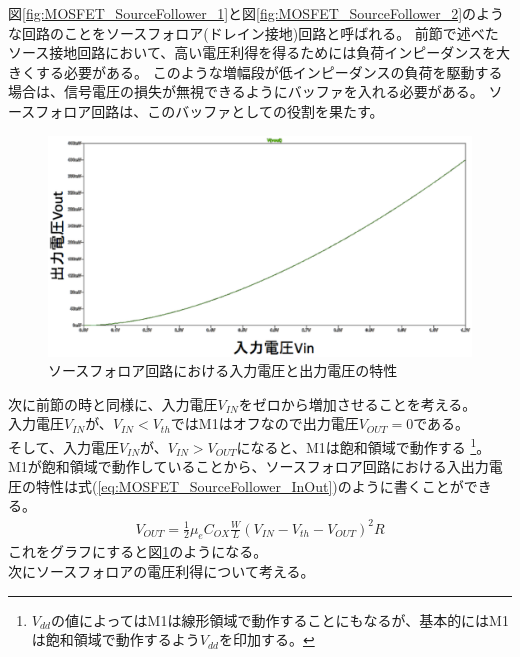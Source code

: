 			図\ref{fig:MOSFET_SourceFollower_1}と図\ref{fig:MOSFET_SourceFollower_2}のような回路のことをソースフォロア(ドレイン接地)回路と呼ばれる。
			前節で述べたソース接地回路において、高い電圧利得を得るためには負荷インピーダンスを大きくする必要がある。
			このような増幅段が低インピーダンスの負荷を駆動する場合は、信号電圧の損失が無視できるようにバッファを入れる必要がある。
			ソースフォロア回路は、このバッファとしての役割を果たす。\\
			\begin{figure}[htbp]
				\begin{center}
					\includegraphics[width=12.0cm]{./Chapter/Chapter3/Picture/MOSFET_SourceFollower_InOut.eps}
					\caption{ソースフォロア回路における入力電圧と出力電圧の特性}
					\label{fig:MOSFET_SourceFollower_InOut}
				\end{center}
			\end{figure}
			次に前節の時と同様に、入力電圧$V_{IN}$をゼロから増加させることを考える。\\
			入力電圧$V_{IN}$が、$V_{IN} < V_{th}$ではM1はオフなので出力電圧$V_{OUT}=0$である。\\
			そして、入力電圧$V_{IN}$が、$V_{IN} > V_{OUT}$になると、M1は飽和領域で動作する
			\footnote{$V_{dd}$の値によってはM1は線形領域で動作することにもなるが、基本的にはM1は飽和領域で動作するよう$V_{dd}$を印加する。}。
			M1が飽和領域で動作していることから、ソースフォロア回路における入出力電圧の特性は式(\ref{eq:MOSFET_SourceFollower_InOut})のように書くことができる。
			\begin{eqnarray}
				V_{OUT} = \frac{1}{2} \mu_e C_{OX} \frac{W}{L} {(V_{IN} - V_{th} - V_{OUT})}^2 R
				\label{eq:MOSFET_SourceFollower_InOut}
			\end{eqnarray}
			これをグラフにすると図\ref{fig:MOSFET_SourceFollower_InOut}のようになる。\\
			次にソースフォロアの電圧利得について考える。
